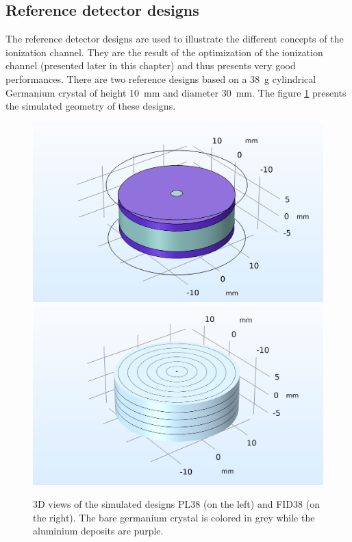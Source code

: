 \subsection{Reference detector designs}

The reference detector designs are used to illustrate the different concepts of the ionization channel. They are the result of the optimization of the ionization channel (presented later in this chapter) and thus presents very good performances. There are two reference designs based on a \SI{38}{\g} cylindrical Germanium crystal of height \SI{10}{\mm} and diameter \SI{30}{\mm}. The figure \ref{fig:reference-design-3d} presents the simulated geometry of these designs.

\begin{figure}
\centering
\includegraphics[scale=0.5]{Figures/Electrodes/planar38_3d.png}
\includegraphics[scale=0.5]{Figures/Electrodes/fid38_3d.png}
\caption{3D views of the simulated designs PL38 (on the left) and FID38 (on the right). The bare germanium crystal is colored in grey while the aluminium deposits are purple.}
\label{fig:reference-design-3d}
\end{figure}

